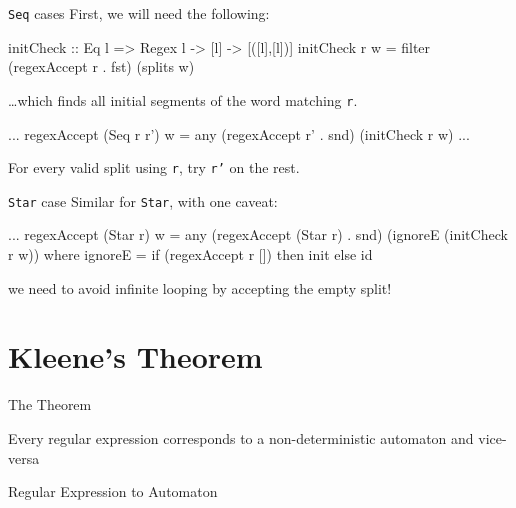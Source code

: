 \documentclass{beamer}
\begin{document}
\begin{frame}[fragile]{\texttt{Seq} cases}
  First, we will need the following:
\begin{code}
initCheck :: Eq l => Regex l -> [l] -> [([l],[l])]
initCheck r w = filter (regexAccept r . fst) (splits w)
\end{code}\vspace{1em}
 \ldots which finds all initial segments of the word matching \texttt{r}.
\begin{code}
...
regexAccept (Seq r r') w = any (regexAccept r' . snd)
                               (initCheck r w)
...
\end{code}\vspace{1em}
For every valid split using \texttt{r}, try \texttt{r'} on the rest.
\end{frame}

\begin{frame}[fragile]{\texttt{Star} case}
Similar for \texttt{Star}, with one caveat:
\begin{code}
...
regexAccept (Star r) w = any (regexAccept (Star r) . snd)
                             (ignoreE (initCheck r w))
  where ignoreE = if (regexAccept r []) then init else id 
\end{code}\vspace{1em}
we need to avoid infinite looping by accepting the empty split!
\end{frame}

\section{Kleene's Theorem}
\begin{frame}{The Theorem}
	\large
	\begin{theorem}
		Every regular expression corresponds to a non-deterministic automaton and vice-versa
	\end{theorem}
\end{frame}

\begin{frame}{Regular Expression to Automaton}
\end{frame}
\end{document}
